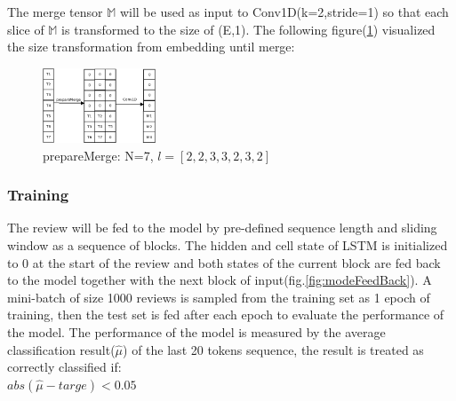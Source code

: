 \documentclass[12pt]{article}
\begin{document}
The merge tensor $\mathbb{M}$ will be used as input to Conv1D(k=2,stride=1) so that each slice of $\mathbb{M}$ is transformed to the size of (E,1). The following figure(\ref{fig:prepareMerge}) visualized the size transformation from embedding until merge:
\begin{figure} [!h]
\begin{center}
\includegraphics[width=0.3\textwidth]{figures/prepareMerge.png}
\caption{prepareMerge: N=7, $l=[2,2,3,3,2,3,2]$}
\label{fig:prepareMerge}
\end{center}
\end{figure}


\subsubsection{Training}
The review will be fed to the model by pre-defined sequence length and sliding window as a sequence of blocks. The hidden and cell state of LSTM is initialized to 0 at the start of the review and both states of the current block are fed back to the model together with the next block of input(fig.\ref{fig:modeFeedBack}). A mini-batch of size 1000 reviews is sampled from the training set as 1 epoch of training, then the test set is fed after each epoch to evaluate the performance of the model. The performance of the model is measured by the average classification result($\hat{\mu}$) of the last 20 tokens sequence, the result is treated as correctly classified if:\\
$abs(\hat{\mu}-targe)<0.05$
   
\end{document}
